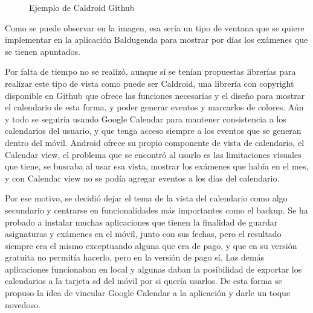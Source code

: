 \begin{figure}[H] 
  \begin{center} 
    \caption{Ejemplo de Caldroid Github} 
    \label{fig:Caldroid} 
  \end{center} 
\end{figure}

Como se puede observar en la imagen, esa sería un tipo de ventana que se quiere implementar en la aplicación Baldugenda para mostrar por días los exámenes que se tienen apuntados.

Por falta de tiempo no se realizó, aunque sí se tenían propuestas librerías para realizar este tipo de vista como puede ser Caldroid, una librería con copyright disponible en Github que ofrece las funciones necesarias y el diseño para mostrar el calendario de esta forma, y poder generar eventos y marcarlos de colores.
Aún y todo se seguiría usando Google Calendar para mantener consistencia a los calendarios del usuario, y que tenga acceso siempre a los eventos que se generan dentro del móvil.
Android ofrece su propio componente de vista de calendario, el Calendar view, el problema que se encontró al usarlo es las limitaciones visuales que tiene, se buscaba al usar esa vista, mostrar los exámenes que había en el mes, y con Calendar view no se podía agregar eventos a los días del calendario.

Por ese motivo, se decidió dejar el tema de la vista del calendario como algo secundario y centrarse en funcionalidades más importantes como el backup.
Se ha probado a instalar muchas aplicaciones que tienen la finalidad de guardar asignaturas y exámenes en el móvil, junto con sus fechas, pero el resultado siempre era el mismo exceptuando alguna que era de pago, y que en su versión gratuita no permitía hacerlo, pero en la versión de pago sí. Las demás aplicaciones funcionaban en local y algunas daban la posibilidad de exportar los calendarios a la tarjeta sd del móvil por si quería usarlos.
De esta forma se propuso la idea de vincular Google Calendar a la aplicación y darle un toque novedoso.

